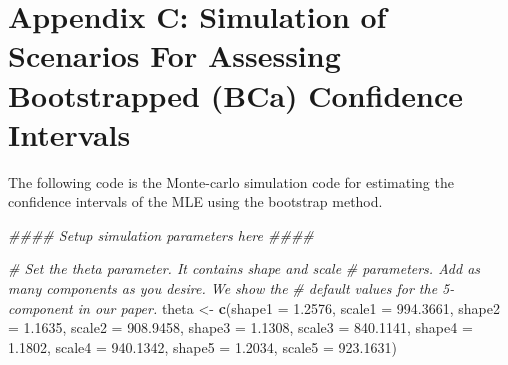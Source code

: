 \documentclass[
]{article}
\newenvironment{Shaded}{\begin{snugshade}}{\end{snugshade}}
\newcommand{\CommentTok}[1]{\textcolor[rgb]{0.56,0.35,0.01}{\textit{#1}}}
\newcommand{\DataTypeTok}[1]{\textcolor[rgb]{0.13,0.29,0.53}{#1}}
\newcommand{\FloatTok}[1]{\textcolor[rgb]{0.00,0.00,0.81}{#1}}
\newcommand{\KeywordTok}[1]{\textcolor[rgb]{0.13,0.29,0.53}{\textbf{#1}}}
\newcommand{\NormalTok}[1]{#1}
\newcommand{\StringTok}[1]{\textcolor[rgb]{0.31,0.60,0.02}{#1}}
\begin{document}
\hypertarget{appendix-c-simulation-of-scenarios-for-assessing-bootstrapped-bca-confidence-intervals}{%
\section*{Appendix C: Simulation of Scenarios For Assessing Bootstrapped
(BCa) Confidence
Intervals}\label{appendix-c-simulation-of-scenarios-for-assessing-bootstrapped-bca-confidence-intervals}}

The following code is the Monte-carlo simulation code for estimating the
confidence intervals of the MLE using the bootstrap method.

\begin{Shaded}
\begin{Highlighting}[]
\CommentTok{\#\#\#\# Setup simulation parameters here \#\#\#\#}

\CommentTok{\# Set the theta parameter. It contains shape and scale}
\CommentTok{\# parameters. Add as many components as you desire. We show the}
\CommentTok{\# default values for the 5{-}component in our paper.}
\NormalTok{theta \textless{}{-}}\StringTok{ }\KeywordTok{c}\NormalTok{(}\DataTypeTok{shape1 =} \FloatTok{1.2576}\NormalTok{, }\DataTypeTok{scale1 =} \FloatTok{994.3661}\NormalTok{, }\DataTypeTok{shape2 =} \FloatTok{1.1635}\NormalTok{, }\DataTypeTok{scale2 =} \FloatTok{908.9458}\NormalTok{,}
    \DataTypeTok{shape3 =} \FloatTok{1.1308}\NormalTok{, }\DataTypeTok{scale3 =} \FloatTok{840.1141}\NormalTok{, }\DataTypeTok{shape4 =} \FloatTok{1.1802}\NormalTok{, }\DataTypeTok{scale4 =} \FloatTok{940.1342}\NormalTok{,}
    \DataTypeTok{shape5 =} \FloatTok{1.2034}\NormalTok{, }\DataTypeTok{scale5 =} \FloatTok{923.1631}\NormalTok{)}


\end{Highlighting}
\end{Shaded}
\end{document}
